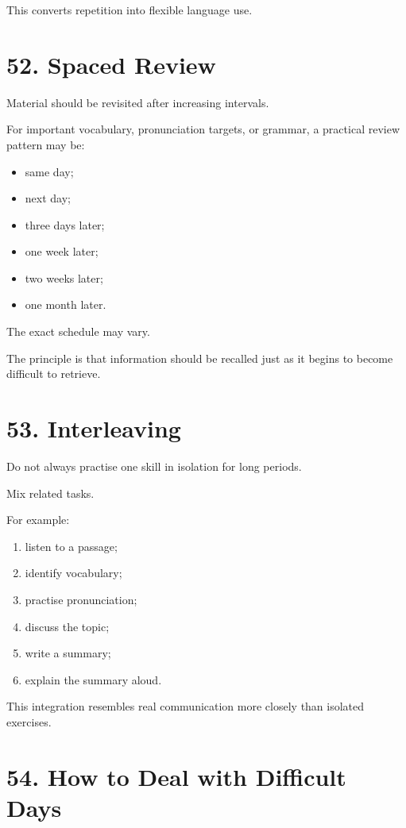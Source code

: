 This converts repetition into flexible language use.

\section*{52. Spaced Review}

Material should be revisited after increasing intervals.

For important vocabulary, pronunciation targets, or grammar, a practical review pattern may be:

\begin{itemize}
    \item same day;
    \item next day;
    \item three days later;
    \item one week later;
    \item two weeks later;
    \item one month later.
\end{itemize}

The exact schedule may vary.

The principle is that information should be recalled just as it begins to become difficult to retrieve.

\section*{53. Interleaving}

Do not always practise one skill in isolation for long periods.

Mix related tasks.

For example:

\begin{enumerate}
    \item listen to a passage;
    \item identify vocabulary;
    \item practise pronunciation;
    \item discuss the topic;
    \item write a summary;
    \item explain the summary aloud.
\end{enumerate}

This integration resembles real communication more closely than isolated exercises.

\section*{54. How to Deal with Difficult Days}

